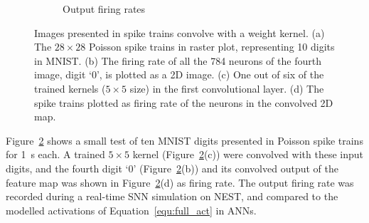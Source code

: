 \begin{figure}[tbh!]
\begin{subfigure}[t]{0.3\textwidth}
			\caption{Output firing rates}
			\label{Fig:64}
		\end{subfigure}
		\caption{Images presented in spike trains convolve with a weight kernel. (a) The $28\times28$ Poisson spike trains in raster plot, representing 10 digits in MNIST. (b) The firing rate of all the 784 neurons of the fourth image, digit `0', is plotted as a 2D image.
		(c) One out of six of the trained kernels ($5\times5$ size) in the first convolutional layer.
		(d) The spike trains plotted as firing rate of the neurons in the convolved 2D map.}
		\label{fig:cnn}
	\end{figure}

	Figure~\ref{fig:cnn} shows a small test of ten MNIST digits presented in Poisson spike trains for 1~s each.
	A trained $5\times5$ kernel (Figure~\ref{fig:cnn}(c)) were convolved with these input digits, and the fourth digit `0' (Figure~\ref{fig:cnn}(b)) and its convolved output of the feature map was shown in Figure~\ref{fig:cnn}(d) as firing rate.
	The output firing rate was recorded during a real-time SNN simulation on NEST, and compared to the modelled activations of Equation~\ref{equ:full_act} in ANNs.
	
